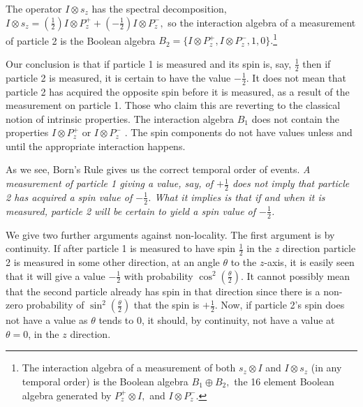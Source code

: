 \documentclass{article}
\begin{document}
The operator $I\otimes s_z$  has the spectral decomposition, $I\otimes s_z =  (\frac{1}{2})I\otimes  P_z^+ + (-\frac{1}{2})I\otimes P_z^-,$ so the interaction algebra of a measurement of particle 2 is the Boolean algebra $B_2 = \{ I\otimes  P_z^+, I\otimes P_z^-, 1, 0\}.$\footnote{ The interaction algebra of a measurement of both $s_z\otimes I$ and $I\otimes s_z$ (in any temporal order) is the Boolean algebra $B_1\oplus  B_2,$ the 16 element  Boolean algebra generated by $P_z^+\otimes I,$  and  $I\otimes  P_z^-.$                                                                                                                                                                                                                                                                                                         }

Our conclusion is that if particle 1 is measured and its spin is, say, $\frac{1}{2}$ then if particle 2 is measured, it is certain to have the value $-\frac{1}{2}$. It does not mean that particle 2 has acquired the opposite spin before it is measured, as a result of the measurement on particle 1. Those who claim this are reverting to the classical notion of intrinsic properties. The interaction algebra $B_1$ does not contain the properties $I\otimes P_z^+$ or $I\otimes P_z^-$ . The spin components do not have values unless and until the appropriate interaction happens.                                                                                                                                            
    
As we see, Born's Rule gives us the correct temporal order of events. \emph{A measurement of particle 1 giving a value, say, of $+\frac{1}{2}$ does not imply that particle 2 has acquired a spin value  of $-\frac{1}{2}$. What it  implies is that if and when it is measured, particle 2 will be certain to yield a spin value of $-\frac{1}{2}$.   }


 We give two further arguments against non-locality. The first argument is by continuity. If after particle 1 is measured to have spin $\frac{1}{2}$ in the $z$ direction particle 2 is measured in some other direction, at an angle $\theta$ to the $z$-axis, it is easily seen that it will give a value $-\frac{1}{2}$ with probability $\cos^2{(\frac{\theta}{2})}$. It cannot possibly mean that the second particle already has spin in that direction since there is a non-zero probability of $\sin^2{(\frac{\theta}{2})}$ that the spin is $+\frac{1}{2}$. Now, if particle 2's spin does not have a value as $\theta$ tends to 0, it should, by continuity, not have a value at $\theta =  0$, in the $z$ direction.
\end{document}

